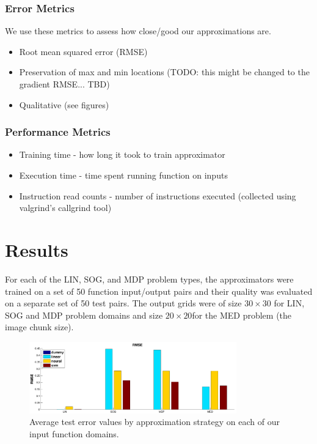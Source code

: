 \documentclass{article}
\begin{document}
\subsubsection{Error Metrics}
We use these metrics to assess how close/good our approximations are.

\begin{itemize}
\item Root mean squared error (RMSE)
\item Preservation of max and min locations (TODO: this might be changed to the gradient RMSE... TBD)
\item Qualitative (see figures)
\end{itemize}

\subsubsection{Performance Metrics}
\begin{itemize}
\item Training time - how long it took to train approximator
\item Execution time - time spent running function on inputs
\item Instruction read counts - number of instructions executed (collected using valgrind's callgrind tool)
\end{itemize}

\section{Results}

For each of the LIN, SOG, and MDP problem types, the approximators were trained on a set of 50 function input/output pairs and their quality was evaluated on a separate set of 50 test pairs. The output grids were of size $30 \times 30$ for LIN, SOG and MDP problem domains and size $20 \times 20$for the MED problem (the image chunk size).



\begin{figure}
  \centering
  \includegraphics[width=0.8\textwidth]{images/results_rmse}
  \caption{Average test error values by approximation strategy on each of our input function domains.}
\end{figure}
\end{document}
